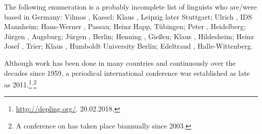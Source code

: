 The following enumeration is a probably incomplete list of linguists who are/were based in Germany: 
Vilmos \citet{Agel2000a-u}, Kassel; 
Klaus \citet{Baumgaertner65a-u,Baumgaertner70a}, Leipzig later Stuttgart;
Ulrich \citet{Engel77,Engel2014a}, IDS Mannheim; 
Hans-Werner \citet{Eroms85a,Eroms87b-u,Eroms2000a}, Passau; 
Heinz Happ, Tübingen;
Peter \citet{Hellwig78a-u,Hellwig2003a}, Heidelberg;
Jürgen \citet{Heringer96a-u}, Augsburg; 
Jürgen \citet{Kunze68a-u,Kunze75a-u}, Berlin;
Henning \citet{Lobin93a-u}, Gießen;
Klaus \citet{Schubert87a-u}, Hildesheim;
Heinz Josef \citet{Weber97a}, Trier;
Klaus \citet{Welke88a-u,Welke2011a-u}, Humboldt University Berlin;
Edeltraud \citet{Werner93a-u}, Halle-Wittenberg.\pagebreak


Although work has been done in many countries and continuously over the decades since 1959, a
periodical international conference was established as late as 2011.\footnote{
  \href{http://depling.org/}{http://depling.org/}. 20.02.2018.
}$^,$\footnote{
  A conference on \mtt has taken place biannually since 2003.
}

